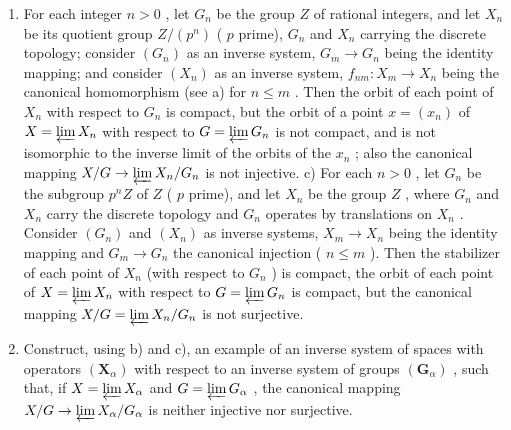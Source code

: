 \begin{enumerate}
\def\labelenumi{\alph{enumi})}
\setcounter{enumi}{1}
\item
  For each integer \(n > 0\) , let \(G_n\) be the group \(Z\) of rational integers, and let \(X_n\) be its quotient group \(Z/(p^n)\) ( \(p\) prime), \(G_n\) and \(X_n\) carrying the discrete topology; consider \((G_n)\) as an inverse system, \(G_m \to G_n\) being the identity mapping; and consider \((X_n)\) as an inverse system, \(f_{nm}: X_m \to X_n\) being the canonical homomorphism (see a) for \(n \leqslant m\) . Then the orbit of each point of \(X_n\) with respect to \(G_n\) is compact, but the orbit of a point \(x = (x_n)\) of \(X = \varprojlim X_n\) with respect to \(G = \varprojlim G_n\) is not compact, and is not isomorphic to the inverse limit of the orbits of the \(x_n\) ; also the canonical mapping \(X/G \to \varprojlim X_n/G_n\) is not injective. c) For each \(n > 0\) , let \(G_n\) be the subgroup \(p^n Z\) of \(Z\) ( \(p\) prime), and let \(X_n\) be the group \(Z\) , where \(G_n\) and \(X_n\) carry the discrete topology and \(G_n\) operates by translations on \(X_n\) . Consider \((G_n)\) and \((X_n)\) as inverse systems, \(X_m \to X_n\) being the identity mapping and \(G_m \to G_n\) the canonical injection ( \(n \leqslant m\) ). Then the stabilizer of each point of \(X_n\) (with respect to \(G_n\) ) is compact, the orbit of each point of \(X = \varprojlim X_n\) with respect to \(G = \varprojlim G_n\) is compact, but the canonical mapping \(X/G = \varprojlim X_n/G_n\) is not surjective.
\item
  Construct, using b) and c), an example of an inverse system of spaces with operators \((\mathbf{X}_{\alpha})\) with respect to an inverse system of groups \((\mathbf{G}_{\alpha})\) , such that, if \(X = \varprojlim X_{\alpha}\) and \(G = \varprojlim G_{\alpha}\) , the canonical mapping \(X/G \to \varprojlim X_{\alpha}/G_{\alpha}\) is neither injective nor surjective.
\end{enumerate}

